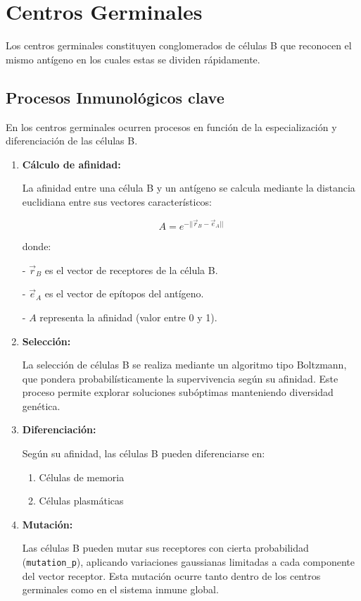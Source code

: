 \section{Centros Germinales}

Los centros germinales constituyen conglomerados de células B que reconocen el mismo antígeno en los cuales estas se dividen rápidamente.
\subsection{Procesos Inmunológicos clave}
En los centros germinales ocurren procesos en función de la especialización y diferenciación de las células B.
\begin{enumerate}
    \item \textbf{Cálculo de afinidad:}
     
    La afinidad entre una célula B y un antígeno se calcula mediante la distancia euclidiana entre sus vectores característicos:

    $$
    A = e^{-||\vec{r}_{B} - \vec{e}_{A}||}
    $$
    
    donde:
    
        
    - $\vec{r}_B$ es el vector de receptores de la célula B.
        
    - $\vec{e}_A$ es el vector de epítopos del antígeno.
        
    - $A$ representa la afinidad (valor entre 0 y 1).
    \item \textbf{Selección:}
    
    La selección de células B se realiza mediante un algoritmo tipo Boltzmann, que pondera probabilísticamente la supervivencia según su afinidad. Este proceso permite explorar soluciones subóptimas manteniendo diversidad genética.
    \item \textbf{Diferenciación:}
    
    Según su afinidad, las células B pueden diferenciarse en:
        \begin{enumerate}
            \item Células de memoria 
            \item Células plasmáticas 
        \end{enumerate}
    \item \textbf{Mutación:}
    
    Las células B pueden mutar sus receptores con cierta probabilidad (\texttt{mutation\_p}), aplicando variaciones gaussianas limitadas a cada componente del vector receptor. Esta mutación ocurre tanto dentro de los centros germinales como en el sistema inmune global.
\end{enumerate}

